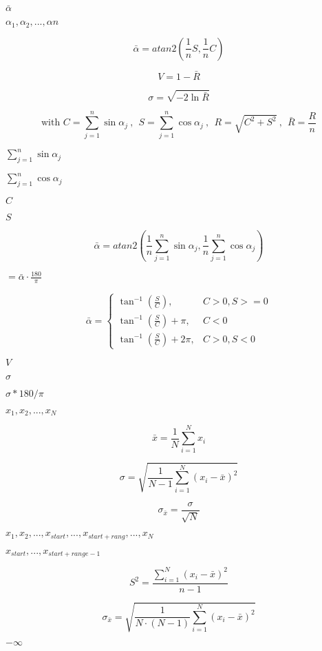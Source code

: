 \documentclass{article}
\begin{document}
$ \bar{\alpha} $
\pagebreak

$ \alpha_{1}, \alpha_{2}, ..., \alpha{n} $
\pagebreak

\[ \bar{\alpha} = atan2\left( \frac{1}{n} S, \frac{1}{n} C \right) \]
\pagebreak

\[ V = 1 - \bar{R} \]
\pagebreak

\[ \sigma = \sqrt{ - 2 \ln{ \bar{R} } } \]
\pagebreak

\[ \mbox{with } C = \sum_{j=1}^{n}{\sin{\alpha_{j}}} \ , \ \ S = \sum_{j=1}^{n}{\cos{\alpha_{j}}} \ , \ \ R = \sqrt{ C^2 + S^2 } \ , \ \ \bar{R} = \frac{R}{n} \]
\pagebreak

$ \sum_{j=1}^{n}{\sin{\alpha_{j}}} $
\pagebreak

$ \sum_{j=1}^{n}{\cos{\alpha_{j}}} $
\pagebreak

$ C $
\pagebreak

$ S $
\pagebreak

\[ \bar{\alpha} = atan2\left( \frac{1}{n} \sum_{j=1}^{n}{\sin{\alpha_{j}}}, \frac{1}{n} \sum_{j=1}^{n}{\cos{\alpha_{j}}} \right) \]
\pagebreak

$ = \bar{\alpha} \cdot \frac{180}{\pi} $
\pagebreak

\[ \bar{\alpha}=\left\{\begin{array}{ll}\tan^{-1}{ ( \frac{S}{C} ) }, & C > 0, S >= 0 \\ \tan^{-1}{ ( \frac{S}{C} ) } + \pi ,& C < 0 \\ \tan^{-1}{ ( \frac{S}{C} ) } + 2 \pi ,& C > 0, S < 0 \end{array}\right. \]
\pagebreak

$V$
\pagebreak

$ \sigma $
\pagebreak

$ \sigma * 180 / \pi $
\pagebreak

$ x_{1}, x_{2}, ..., x_{N} $
\pagebreak

\[ \bar{x} = \frac{1}{N} \sum_{i=1}^{N}{ x_{i} } \]
\pagebreak

\[ \sigma = \sqrt{ \frac{1}{N-1} \sum_{i=1}^{N}{(x_{i} - \bar{x} )^2} } \]
\pagebreak

\[ \sigma_{\bar{x}} = \frac{\sigma}{\sqrt{N}} \]
\pagebreak

$ x_{1}, x_{2}, ..., x_{start}, ..., x_{start + rang}, ..., x_{N} $
\pagebreak

$ x_{start}, ..., x_{start + range - 1} $
\pagebreak

\[ S^2 = \frac{\sum_{i=1}^{N}{ (x_{i} - \bar{x})^2}}{n - 1} \]
\pagebreak

\[ \sigma_{\bar{x}} = \sqrt{ \frac{1}{N\cdot(N-1)}\sum_{i=1}^{N}{(x_{i} - \bar{x} )^2} } \]
\pagebreak

$-\infty$
\pagebreak
\end{document}
